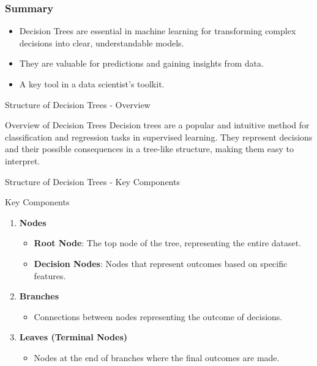 \documentclass[aspectratio=169]{beamer}
\begin{document}
\begin{frame}[fragile]
    \frametitle{Summary}
    \begin{itemize}
        \item Decision Trees are essential in machine learning for transforming complex decisions into clear, understandable models.
        \item They are valuable for predictions and gaining insights from data.
        \item A key tool in a data scientist's toolkit.
    \end{itemize}
\end{frame}

\begin{frame}[fragile]{Structure of Decision Trees - Overview}
    \begin{block}{Overview of Decision Trees}
        Decision trees are a popular and intuitive method for classification and regression tasks in supervised learning. They represent decisions and their possible consequences in a tree-like structure, making them easy to interpret.
    \end{block}
\end{frame}

\begin{frame}[fragile]{Structure of Decision Trees - Key Components}
    \begin{block}{Key Components}
        \begin{enumerate}
            \item \textbf{Nodes}
            \begin{itemize}
                \item \textbf{Root Node}: The top node of the tree, representing the entire dataset.
                \item \textbf{Decision Nodes}: Nodes that represent outcomes based on specific features.
            \end{itemize}
            
            \item \textbf{Branches}
            \begin{itemize}
                \item Connections between nodes representing the outcome of decisions.
            \end{itemize}

            \item \textbf{Leaves (Terminal Nodes)}
            \begin{itemize}
                \item Nodes at the end of branches where the final outcomes are made.
            \end{itemize}
        \end{enumerate}
    \end{block}
\end{frame}
\end{document}
